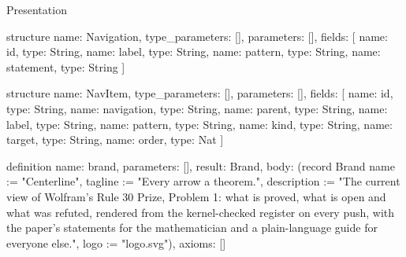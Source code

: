 \begin{lexlean}{Presentation}
\begin{semanticmodule}
structure{
  name: Navigation,
  type_parameters: [],
  parameters: [],
  fields: [
    {name: id, type: String},
    {name: label, type: String},
    {name: pattern, type: String},
    {name: statement, type: String}
  ]
}

structure{
  name: NavItem,
  type_parameters: [],
  parameters: [],
  fields: [
    {name: id, type: String},
    {name: navigation, type: String},
    {name: parent, type: String},
    {name: label, type: String},
    {name: pattern, type: String},
    {name: kind, type: String},
    {name: target, type: String},
    {name: order, type: Nat}
  ]
}

definition{
  name: brand,
  parameters: [],
  result: Brand,
  body: (record Brand {name := "Centerline", tagline := "Every arrow a theorem.", description := "The current view of Wolfram's Rule 30 Prize, Problem 1: what is proved, what is open and what was refuted, rendered from the kernel-checked register on every push, with the paper's statements for the mathematician and a plain-language guide for everyone else.", logo := "logo.svg"}),
  axioms: []
}


\end{semanticmodule}
\end{lexlean}

